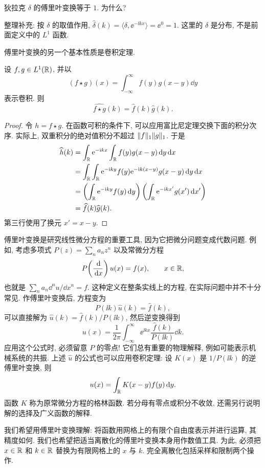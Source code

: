 \begin{example}
狄拉克 $\delta$ 的傅里叶变换等于 $1$. 为什么?
\end{example}
\begin{solution}
整理补充: 按 $\delta$ 的取值作用, $\widehat\delta(k)=\langle\delta,\ee^{-\ii kx}\rangle=\ee^0=1$. 这里的 $\delta$ 是分布, 不是前面定义中的 $L^1$ 函数.
\end{solution}

傅里叶变换的另一个基本性质是卷积定理.

\begin{theorem}[卷积定理]\label{thm:convolution}
设 $f,g\in L^1(\mathbb R)$, 并以
\[
(f\star g)(x)=\int_{-\infty}^{\infty}f(y)g(x-y)\dd y
\]
表示卷积. 则
\[
\widehat{f\star g}(k)=\widehat f(k)\widehat g(k).
\]
\end{theorem}
\begin{proof}
令 $h=f\star g$. 在函数可积的条件下, 可以应用富比尼定理交换下面的积分次序. 实际上, 双重积分的绝对值积分不超过 $\lVert f\rVert_1\lVert g\rVert_1$. 于是
\begin{align*}
\widehat h(k)
&=\int_{\mathbb R}\mathrm e^{-\mathrm i kx}\int_{\mathbb R}f(y)g(x-y)\,\mathrm d y\,\mathrm d x\\
&=\int_{\mathbb R}\int_{\mathbb R}\mathrm e^{-\mathrm i ky}f(y)
\mathrm e^{-\mathrm i k(x-y)}g(x-y)\,\mathrm d y\,\mathrm d x\\
&=\left(\int_{\mathbb R}\mathrm e^{-\mathrm i ky}f(y)\,\mathrm d y\right)
\left(\int_{\mathbb R}\mathrm e^{-\mathrm i kx'}g(x')\,\mathrm d x'\right)\\
&=\widehat f(k)\widehat g(k).
\end{align*}
第三行使用了换元 $x'=x-y$.
\end{proof}

傅里叶变换是研究线性微分方程的重要工具, 因为它把微分问题变成代数问题. 例如, 考虑多项式 $P(z)=\sum_n a_nz^n$ 以及常微分方程
\[
P\!\left(\frac{\,\mathrm d}{\,\mathrm d x}\right)u(x)=f(x),\qquad x\in\mathbb R,
\]
也就是 $\sum_n a_n\dd^nu/\dd x^n=f$. 这种定义在整条实线上的方程, 在实际问题中并不十分常见. 作傅里叶变换后, 方程变为
\[
P(\ii k)\widehat u(k)=\widehat f(k),
\]
可以直接解为 $\widehat u(k)=\widehat f(k)/P(\ii k)$, 然后逆变换得到
\[
u(x)=\frac1{2\pi}\int_{-\infty}^{\infty}
\ee^{\ii kx}\frac{\widehat f(k)}{P(\ii k)}\dd k.
\]
应用这个公式时, 必须留意 $P$ 的零点! 它们总有重要的物理解释, 例如可能表示机械系统的共振. 上述 $\widehat u$ 的公式也可以应用卷积定理: 设 $K(x)$ 是 $1/P(\ii k)$ 的逆傅里叶变换, 则
\[
u(x)=\int_{\mathbb R}K(x-y)f(y)\,\mathrm d y.
\]
函数 $K$ 称为原常微分方程的格林函数. 若分母有零点或积分不收敛, 还需另行说明解的选择及广义函数的解释.

\label{sec:sampling-restriction}
我们希望用傅里叶变换理解: 将函数用网格上的有限个自由度表示并进行运算, 其精度如何. 我们也希望把适当离散化的傅里叶变换本身用作数值工具. 为此, 必须把 $x\in\mathbb R$ 和 $k\in\mathbb R$ 替换为有限网格上的 $x$ 与 $k$. 完全离散化包括采样和限制两个操作.

